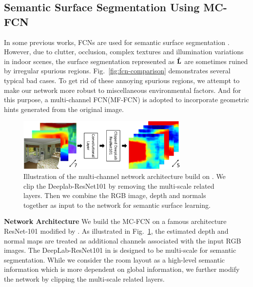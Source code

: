 \subsection{Semantic Surface Segmentation Using MC-FCN}
\label{sec:surfacelabel}
In some previous works, FCNs are used for semantic surface segmentation \cite{dasgupta2016delay,ren2016coarse,mallya2015learning}. 
%
However, due to clutter, occlusion, complex textures and illumination variations in indoor scenes, the surface segmentation represented as $\mathbf{\hat{L}}$ are sometimes ruined by irregular spurious regions. Fig.~\ref{fig:fcn-comparison} demonstrates several typical bad cases.
%
To get rid of these annoying spurious regions, we attempt to make our network more robust to miscellaneous environmental factors. And for this purpose, a multi-channel FCN(MF-FCN) is adopted to incorporate geometric hints generated from the original image. 
%



\begin{figure}
	\centering
	\includegraphics[width=8.5cm]{figure/MC-FCN.png}
	\caption{Illustration of the multi-channel network architecture build on \cite{chen2016deeplab}. We clip the Deeplab-ResNet101 by removing the multi-scale related layers. Then we combine the RGB image, depth and normals together as input to the network for semantic surface learning. }
	\label{fig:fcn-multi-channel}
\end{figure}


\textbf{Network Architecture}
We build the MC-FCN on a famous architecture ResNet-101 \cite{he2016deep} modified by \cite{chen2016deeplab}. As illustrated in Fig.~\ref{fig:fcn-multi-channel}, the estimated depth and normal maps are treated as additional channels associated with the input RGB images. The DeepLab-ResNet101 in \cite{chen2016deeplab} is designed to be multi-scale for semantic segmentation. While we consider the room layout as a high-level semantic information which is more dependent on global information, we further modify the network by clipping the multi-scale related layers. 


